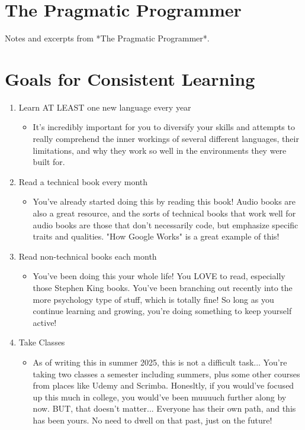 \documentclass{article}
\begin{document}
\section*{The Pragmatic Programmer}
Notes and excerpts from *The Pragmatic Programmer*.

\section*{Goals for Consistent Learning}
\begin{enumerate}
    \item Learn AT LEAST one new language every year
        \begin{itemize}
            \item It's incredibly important for you to diversify your skills and attempts to really comprehend the inner workings of several different languages, their limitations, and why they work so well in the environments they were built for.
        \end{itemize}
    \item Read a technical book every month
        \begin{itemize}
            \item You've already started doing this by reading this book! Audio books are also a great resource, and the sorts of technical books that work well for audio books are those that don't necessarily code, but emphasize specific traits and qualities. "How Google Works" is a great example of this!
        \end{itemize}
    \item Read non-technical books each month
        \begin{itemize}
            \item You've been doing this your whole life! You LOVE to read, especially those Stephen King books. You've been branching out recently into the more psychology type of stuff, which is totally fine! So long as you continue learning and growing, you're doing something to keep yourself active!
        \end{itemize}
    \item Take Classes
        \begin{itemize}
            \item As of writing this in summer 2025, this is not a difficult task... You're taking two classes a semester including summers, plus some other courses from places like Udemy and Scrimba. Honesltly, if you would've focused up this much in college, you would've been muuuuch further along by now. BUT, that doesn't matter... Everyone has their own path, and this has been yours. No need to dwell on that past, just on the future!

\end{itemize}
\end{enumerate}
\end{document}
